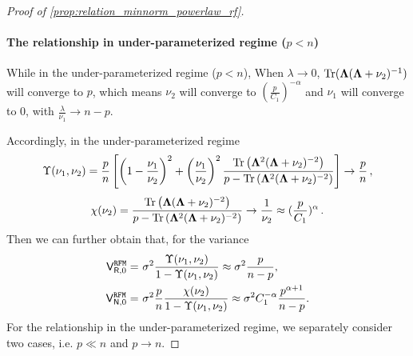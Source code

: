 \begin{proof}[Proof of \cref{prop:relation_minnorm_powerlaw_rf}]
\paragraph{The relationship in under-parameterized regime ($p < n$)} While in the under-parameterized regime ($p < n$), When $\lambda \to 0$, ${\rm Tr}({\boldsymbol \Lambda}({\boldsymbol \Lambda} + \nu_2)^{-1})$ will converge to $p$, which means $\nu_2$ will converge to $(\frac{p}{C_1})^{-\alpha}$ and $\nu_1$ will converge to 0, with $\frac{\lambda}{\nu_1}\to n-p$. 

Accordingly, in the under-parameterized regime
\[
\begin{aligned}
\Upsilon(\nu_1, \nu_2) = \frac{p}{n} \left[ \left( 1 - \frac{\nu_1}{\nu_2} \right)^2 + \left( \frac{\nu_1}{\nu_2} \right)^2 \frac{\operatorname{Tr}\left({\boldsymbol \Lambda}^2 ({\boldsymbol \Lambda} + \nu_2)^{-2}\right)}{p - \operatorname{Tr}\left({\boldsymbol \Lambda}^2 ({\boldsymbol \Lambda} + \nu_2)^{-2}\right)} \right] \to \frac{p}{n}\,,
\end{aligned}
\]
\[
\begin{aligned}
\chi(\nu_2) = \frac{\operatorname{Tr}\left({\boldsymbol \Lambda} ({\boldsymbol \Lambda} + \nu_2)^{-2}\right)}{p - \operatorname{Tr}\left({\boldsymbol \Lambda}^2 ({\boldsymbol \Lambda} + \nu_2)^{-2}\right)} \to \frac{1}{\nu_2} \approx (\frac{p}{C_1})^{\alpha}\,.
\end{aligned}
\]
Then we can further obtain that, for the variance
\[
\begin{aligned}
\mathsf V_{\mathsf R,0}^{\tt RFM} =&~ \sigma^2 \frac{\Upsilon(\nu_1, \nu_2)}{1 - \Upsilon(\nu_1, \nu_2)} \approx \sigma^2 \frac{p}{n-p},\\
\mathsf V_{\mathsf N,0}^{\tt RFM} =&~ \sigma^2 \frac{p}{n} \frac{\chi(\nu_2)}{1 - \Upsilon(\nu_1, \nu_2)} \approx \sigma^2 C_1^{-\alpha} \frac{p^{\alpha+1}}{n-p}.
\end{aligned}
\]
For the relationship in the under-parameterized regime, we separately consider two cases, i.e. $p \ll n$ and $p\to n$.


\end{proof}
